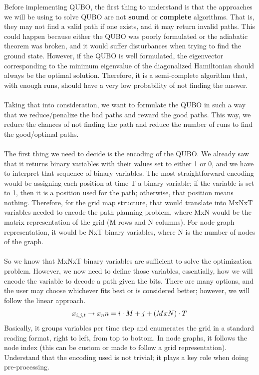\documentclass[11pt]{article}
\begin{document}
Before implementing QUBO, the first thing to understand is that the approaches we will be using to solve QUBO are not \textbf{sound} or \textbf{complete} algorithms. That is, they may not find a valid path if one exists, and it may return invalid paths. This could happen because either the QUBO was poorly formulated or the adiabatic theorem was broken, and it would suffer disturbances when trying to find the ground state. However, if the QUBO is well formulated, the eigenvector corresponding to the minimum eigenvalue of the diagonalized Hamiltonian should always be the optimal solution. Therefore, it is a semi-complete algorithm that, with enough runs, should have a very low probability of not finding the answer.\\
\\
Taking that into consideration, we want to formulate the QUBO in such a way that we reduce/penalize the bad paths and reward the good paths. This way, we reduce the chances of not finding the path and reduce the number of runs to find the good/optimal paths.\\
\\
The first thing we need to decide is the encoding of the QUBO. We already saw that it returns binary variables with their values set to either 1 or 0, and we have to interpret that sequence of binary variables. The most straightforward encoding would be assigning each position at time T a binary variable; if the variable is set to 1, then it is a position used for the path; otherwise, that position means nothing. Therefore, for the grid map structure, that would translate into MxNxT variables needed to encode the path planning problem, where MxN would be the matrix representation of the grid (M rows and N columns). For node graph representation, it would be NxT binary variables, where N is the number of nodes of the graph.\\
\\
So we know that MxNxT binary variables are sufficient to solve the optimization problem. However, we now need to define those variables, essentially, how we will encode the variable to decode a path given the bits. There are many options, and the user may choose whichever fits best or is considered better; however, we will follow the linear approach. 
\[
x_{i,j,t}\to x_n\\
n = i\cdot M + j + (MxN)\cdot T
\]
Basically, it groups variables per time step and enumerates the grid in a standard reading format, right to left, from top to bottom. In node graphs, it follows the node index (this can be custom or made to follow a grid representation). Understand that the encoding used is not trivial; it plays a key role when doing pre-processing.\\
\end{document}
